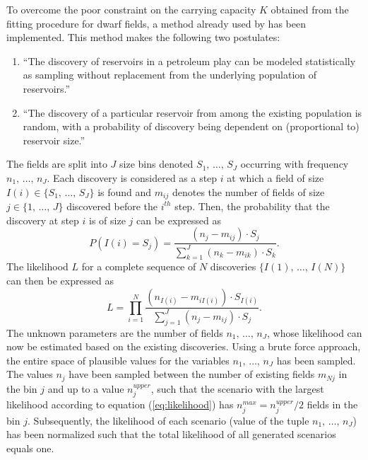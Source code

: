 \documentclass[review]{elsarticle}
\begin{document}
To overcome the poor constraint on the carrying capacity
$K$ obtained from the fitting procedure for dwarf fields, a method
already used by \cite{Smith1980} has been implemented. This
method makes the following two postulates:
\begin{enumerate}
\item ``The discovery of reservoirs in a petroleum play can be modeled
statistically as sampling without replacement from the underlying
population of reservoirs.''
\item ``The discovery of a particular reservoir from among the existing
population is random, with a probability of discovery being dependent 
on (proportional to) reservoir size.''
\end{enumerate}
The fields are split into $J$ size bins denoted $S_{1},\,\ldots,\, S_{J}$
occurring with frequency $n_{1},\,\ldots,\, n_{J}$. Each discovery
is considered as a step $i$ at which a field of size $I(i)\in\{S_{1},\,\ldots,\, S_{J}\}$
is found and $m_{ij}$ denotes the number of fields of size $j\in\{1,\,\ldots,\, J\}$
discovered before the $i^{th}$ step. Then, the probability that the
discovery at step $i$ is of size $j$ can be expressed as
\begin{equation}
P\left(I(i)=S_{j}\right)=\frac{\left(n_{j}-m_{ij}\right)\cdot S_{j}}{\sum_{k=1}^{J}\left(n_{k}-m_{ik}\right)\cdot S_{k}}.
\end{equation}
The likelihood $L$ for a complete sequence of $N$ discoveries $\{I(1),\,\ldots,\, I(N)\}$
can then be expressed as
\begin{equation}
L=\prod_{i=1}^{N}\frac{\left(n_{I(i)}-m_{iI(i)}\right)\cdot S_{I(i)}}{\sum_{j=1}^{J}\left(n_{j}-m_{ij}\right)\cdot S_{j}}.\label{eq:likelihood}
\end{equation}
The unknown parameters are the number of fields $n_{1},\,\ldots,\, n_{J}$,
whose likelihood can now be estimated based on the existing discoveries.
Using a brute force approach, the entire space of plausible values
for the variables $n_{1},\,\ldots,\, n_{J}$ has been sampled. The
values $n_{j}$ have been sampled between the number of existing fields
$m_{Nj}$ in the bin $j$ and up to a value $n_{j}^{upper}$, such
that the scenario with the largest likelihood according to equation
(\ref{eq:likelihood}) has $n_{j}^{max}=n_{j}^{upper}/2$ fields in
the bin $j$. Subsequently, the likelihood of each scenario (value
of the tuple $n_{1},\,\ldots,\, n_{J}$) has been normalized such
that the total likelihood of all generated scenarios equals one.
\end{document}
